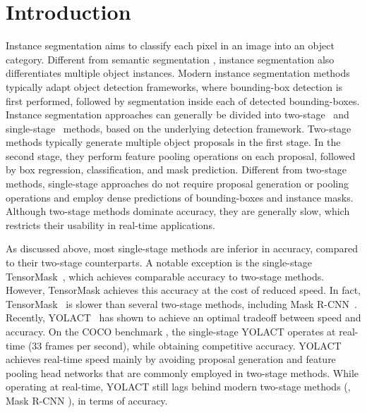 \documentclass[runningheads]{llncs}
\begin{document}
\section{Introduction}

Instance segmentation aims to classify each pixel in an image into an object category. Different from semantic segmentation \cite{Long_FCN_CVPR_2015,Chen_Deeplab_PAMI_2017,Cao_TripleNet_CVPR_2019,Pang_SeENet_ICCV_2019,Sun_Mining_ECCV_2020}, instance segmentation also differentiates multiple object instances. Modern instance segmentation methods typically adapt object detection frameworks, where bounding-box detection is first performed, followed by segmentation inside each of detected bounding-boxes. Instance segmentation approaches can generally be divided into two-stage~\cite{He_MaskRCNN_ICCV_2017,Liu_PANet_CVPR_2018,Chen_HTC_CVPR_2019,Huang_MSRCNN_CVPR_2019,Fang_InstaBoost_ICCV_2019} and single-stage~\cite{Pinheiro_ROS_ECCV_2016,Dai_InstanceFCN_ECCV_2016,Xu_ESE_ICCV_2019,Bolya_YOLACT_ICCV_2019,Wang_RDSNet_AAAI_2020,Peng_DeepSnake_CVPR_2020} methods, based on the underlying detection framework. Two-stage methods typically generate  multiple object proposals in the first stage. In the second stage, they  perform feature pooling operations on each proposal, followed by  box regression, classification, and mask prediction. Different from two-stage methods, single-stage approaches do not require proposal generation or pooling operations and employ dense predictions of bounding-boxes and instance masks. Although two-stage methods dominate accuracy, they are generally slow, which restricts their usability in real-time applications.

As discussed above, most single-stage methods are inferior in accuracy, compared to their two-stage counterparts. A notable exception is the single-stage TensorMask~\cite{Chen_TensorMask_ICCV_2019}, which achieves comparable  accuracy to two-stage methods. However, TensorMask achieves this accuracy at the cost of reduced speed. In fact, TensorMask~\cite{Chen_TensorMask_ICCV_2019} is slower than several two-stage methods, including Mask R-CNN~\cite{He_MaskRCNN_ICCV_2017}. Recently, YOLACT~\cite{Bolya_YOLACT_ICCV_2019} has shown to achieve an optimal tradeoff between speed and accuracy. On the COCO benchmark \cite{Lin_COCO_ECCV_2014}, the single-stage YOLACT operates at real-time (33 frames per second), while obtaining competitive accuracy. YOLACT achieves real-time speed mainly by avoiding proposal generation and feature pooling head networks that are commonly employed in two-stage methods. While operating at real-time, YOLACT still lags behind modern two-stage methods (\eg, Mask R-CNN \cite{He_MaskRCNN_ICCV_2017}), in terms of accuracy.
\end{document}
